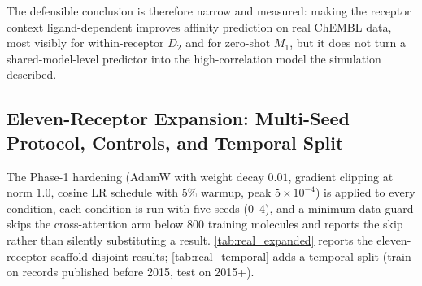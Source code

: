 The defensible conclusion is therefore narrow and measured: making the receptor context ligand-dependent improves affinity prediction on real ChEMBL data, most visibly for within-receptor $D_2$ and for zero-shot $M_1$, but it does not turn a shared-model-level predictor into the high-correlation model the simulation described.

\subsection{Eleven-Receptor Expansion: Multi-Seed Protocol, Controls, and Temporal Split}
\label{sec:expanded}

The Phase-1 hardening (AdamW with weight decay $0.01$, gradient clipping at norm $1.0$, cosine LR schedule with $5\%$ warmup, peak $5 \times 10^{-4}$) is applied to every condition, each condition is run with five seeds (0--4), and a minimum-data guard skips the cross-attention arm below $800$ training molecules and reports the skip rather than silently substituting a result. \cref{tab:real_expanded} reports the eleven-receptor scaffold-disjoint results; \cref{tab:real_temporal} adds a temporal split (train on records published before 2015, test on 2015+).

